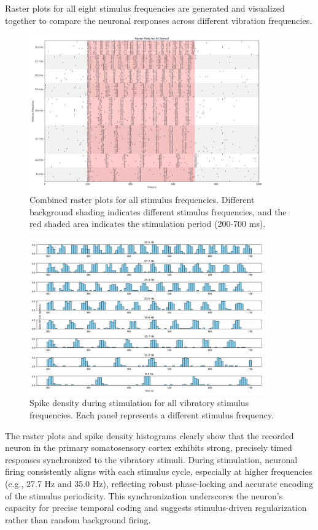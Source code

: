 \documentclass{article}
\begin{document}
Raster plots for all eight stimulus frequencies are generated and visualized together to compare the neuronal responses across different vibration frequencies.


\begin{figure}[H]
\centering
\includegraphics[width=0.9\textwidth]{Fig6.png}
\caption{Combined raster plots for all stimulus frequencies. Different background shading indicates different stimulus frequencies, and the red shaded area indicates the stimulation period (200-700 ms).}
\label{fig:all_rasters}
\end{figure}

\begin{figure}[H]
\centering
\includegraphics[width=0.9\textwidth]{Fig7.png}
\caption{Spike density during stimulation for all vibratory stimulus frequencies. Each panel represents a different stimulus frequency.}
\label{fig:all_densities}
\end{figure}

The raster plots and spike density histograms clearly show that the recorded neuron in the primary somatosensory cortex exhibits strong, precisely timed responses synchronized to the vibratory stimuli. During stimulation, neuronal firing consistently aligns with each stimulus cycle, especially at higher frequencies (e.g., 27.7 Hz and 35.0 Hz), reflecting robust phase-locking and accurate encoding of the stimulus periodicity. 
This synchronization underscores the neuron's capacity for precise temporal coding and suggests stimulus-driven regularization rather than random background firing.
\end{document}
